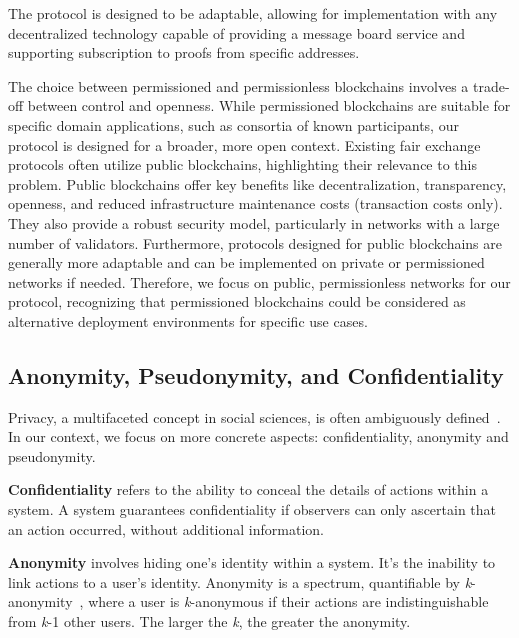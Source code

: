 \documentclass[pdftex,twocolumn,epjc3]{svjour3}
\begin{document}
The protocol is designed to be adaptable, allowing for implementation with any decentralized technology capable of providing a message board service and supporting subscription to proofs from specific addresses.

\begin{sloppypar}
The choice between permissioned and permissionless blockchains involves a trade-off between control and openness. While permissioned blockchains are suitable for specific domain applications, such as consortia of known participants, our protocol is designed for a broader, more open context.  Existing fair exchange protocols often utilize public blockchains, highlighting their relevance to this problem. Public blockchains offer key benefits like decentralization, transparency, openness, and reduced infrastructure maintenance costs (transaction costs only). They also provide a robust security model, particularly in networks with a large number of validators. Furthermore, protocols designed for public blockchains are generally more adaptable and can be implemented on private or permissioned networks if needed. Therefore, we focus on public, permissionless networks for our protocol, recognizing that permissioned blockchains could be considered as alternative deployment environments for specific use cases.
\end{sloppypar}

\subsection{Anonymity, Pseudonymity, and Confidentiality}\label{sec:pseudo-anon}

\begin{sloppypar}
Privacy, a multifaceted concept in social sciences, is often ambiguously defined~\cite{smithInformationPrivacyResearch2011}. In our context, we focus on more concrete aspects: confidentiality, anonymity and pseudonymity.
\end{sloppypar}

\textbf{Confidentiality} refers to the ability to conceal the details of actions within a system. A system guarantees confidentiality if observers can only ascertain that an action occurred, without additional information.

\textbf{Anonymity} involves hiding one's identity within a system. It's the inability to link actions to a user's identity. Anonymity is a spectrum, quantifiable by \textit{k}-anonymity~\cite{sweeneyKanonymityModelProtecting2002}, where a user is \textit{k}-anonymous if their actions are indistinguishable from \textit{k}-1 other users. The larger the \textit{k}, the greater the anonymity.
\end{document}
